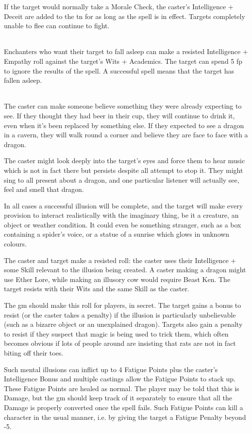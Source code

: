 \begin{multicols}{2}
If the target would normally take a Morale Check, the caster's Intelligence + Deceit are added to the \gls{tn} for as long as the spell is in effect.
Targets completely unable to flee can continue to fight.

\\
Enchanters who want their target to fall asleep can make a resisted Intelligence + Empathy roll against the target's Wits + Academics.
The target can spend 5 \gls{fp} to ignore the results of the spell. A successful spell means that the target has fallen asleep.

\\
The caster can make someone believe something they were already expecting to see.
If they thought they had beer in their cup, they will continue to drink it, even when it's been replaced by something else.
If they expected to see a dragon in a cavern, they will walk round a corner and believe they are face to face with a dragon.

The caster might look deeply into the target's eyes and force them to hear music which is not in fact there but persists despite all attempt to stop it. They might sing to all present about a dragon, and one particular listener will actually see, feel and smell that dragon.

In all cases a successful illusion will be complete, and the target will make every provision to interact realistically with the imaginary thing, be it a creature, an object or weather condition. It could even be something stranger, such as a box containing a spider's voice, or a statue of a sunrise which glows in unknown colours.

The caster and target make a resisted roll: the caster uses their Intelligence + some Skill relevant to the illusion being created. A caster making a dragon might use Ether Lore, while making an illusory cow would require Beast Ken. The target resists with their Wits and the same Skill as the caster.

The \gls{gm} should make this roll for players, in secret. The target gains a bonus to resist (or the caster takes a penalty) if the illusion is particularly unbelievable (such as a bizarre object or an unexplained dragon). Targets also gain a penalty to resist if they suspect that magic is being used to trick them, which often becomes obvious if lots of people around are insisting that rats are not in fact biting off their toes.

Such mental illusions can inflict up to 4 Fatigue Points plus the caster's Intelligence Bonus and multiple castings allow the Fatigue Points to stack up. These Fatigue Points are healed as normal. The player may be told that this is Damage, but the \gls{gm} should keep track of it separately to ensure that all the Damage is properly converted once the spell fails. Such Fatigue Points can kill a character in the usual manner, i.e. by giving the target a Fatigue Penalty beyond -5.


\end{multicols}
